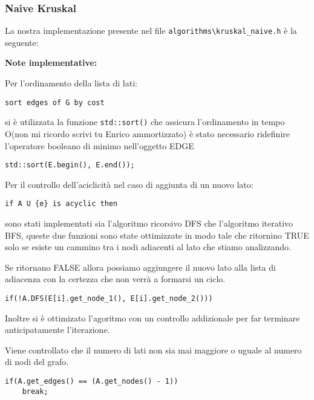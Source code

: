 \documentclass[]{article}
\begin{document}
\subsubsection{Naive Kruskal}
\begin{flushleft}
La nostra implementazione presente nel file \verb|algorithms\kruskal_naive.h| è la seguente:

\lstset{language=c++, style=mystyle}


\textbf{Note implementative:}

\medskip
Per l'ordinamento della lista di lati:

\begin{lstlisting}
sort edges of G by cost
\end{lstlisting}

\smallskip
si è utilizzata la funzione \verb|std::sort()| che assicura l'ordinamento in tempo O(non mi ricordo scrivi tu Enrico ammortizzato)%
 è stato necessario ridefinire l'operatore booleano di minimo nell'oggetto EDGE
 
\lstset{language=c++, style=mystyle, firstnumber=3} 	 	
\begin{lstlisting}
std::sort(E.begin(), E.end());
\end{lstlisting}

\medskip
Per il controllo dell'aciclicità nel caso di aggiunta di un nuovo lato:

\begin{lstlisting}
if A U {e} is acyclic then
\end{lstlisting}

\smallskip
sono stati implementati sia l'algoritmo ricorsivo DFS che l'algoritmo iterativo BFS, queste due funzioni sono state ottimizzate in modo tale che ritornino TRUE solo se esiste un cammino tra i nodi adiacenti al lato che stiamo analizzando.

Se ritornano FALSE allora possiamo aggiungere il nuovo lato alla lista di adiacenza con la certezza che non verrà a formarsi un ciclo.

\lstset{language=c++, style=mystyle, firstnumber=5}
\begin{lstlisting}
if(!A.DFS(E[i].get_node_1(), E[i].get_node_2()))
\end{lstlisting}

\medskip
Inoltre si è ottimizato l'agoritmo con un controllo addizionale per far terminare anticipatamente l'iterazione. 

Viene controllato che il numero di lati non sia mai maggiore o uguale al numero di nodi del grafo.

\lstset{language=c++, style=mystyle, firstnumber=7}
\begin{lstlisting}
if(A.get_edges() == (A.get_nodes() - 1))
    break;
\end{lstlisting}
\end{flushleft}
\end{document}
